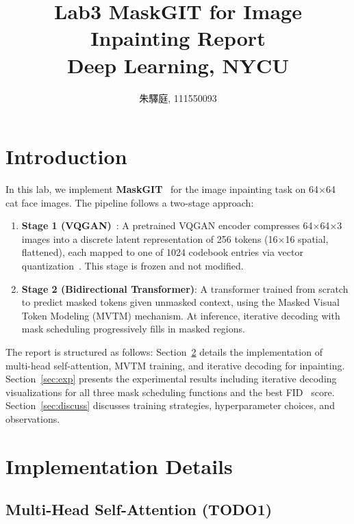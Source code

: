 \documentclass[10pt,twocolumn,letterpaper]{article}
\begin{document}
\title{\LARGE Lab3 MaskGIT for Image Inpainting Report \\[0.5em] \large Deep Learning, NYCU}
\author{朱驛庭, 111550093}
\maketitle

\section{Introduction}
\label{sec:intro}

In this lab, we implement \textbf{MaskGIT}~\cite{chang2022maskgit} for the image inpainting task on 64$\times$64 cat face images. The pipeline follows a two-stage approach:

\begin{enumerate}
	\item \textbf{Stage 1 (VQGAN)}~\cite{esser2021vqgan}: A pretrained VQGAN encoder compresses 64$\times$64$\times$3 images into a discrete latent representation of 256 tokens (16$\times$16 spatial, flattened), each mapped to one of 1024 codebook entries via vector quantization~\cite{oord2017vqvae}. This stage is frozen and not modified.
	\item \textbf{Stage 2 (Bidirectional Transformer)}: A transformer trained from scratch to predict masked tokens given unmasked context, using the Masked Visual Token Modeling (MVTM) mechanism. At inference, iterative decoding with mask scheduling progressively fills in masked regions.
\end{enumerate}

The report is structured as follows:
Section~\ref{sec:implement} details the implementation of multi-head self-attention, MVTM training, and iterative decoding for inpainting.
Section~\ref{sec:exp} presents the experimental results including iterative decoding visualizations for all three mask scheduling functions and the best FID~\cite{heusel2017fid} score.
Section~\ref{sec:discuss} discusses training strategies, hyperparameter choices, and observations.

\section{Implementation Details} \label{sec:implement}

\subsection{Multi-Head Self-Attention (TODO1)}
\end{document}
